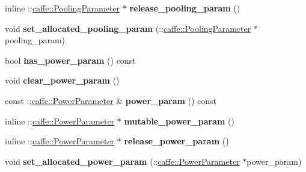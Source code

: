 \begin{DoxyCompactItemize}
\item 
\mbox{\label{classcaffe_1_1_v1_layer_parameter_a87d7d6df46f4474a17a983291fba08db}} 
inline \+::\mbox{\hyperlink{classcaffe_1_1_pooling_parameter}{caffe\+::\+Pooling\+Parameter}} $\ast$ {\bfseries release\+\_\+pooling\+\_\+param} ()
\item 
\mbox{\label{classcaffe_1_1_v1_layer_parameter_a6b72b3c1dfd7142581b07d03fc73a9e9}} 
void {\bfseries set\+\_\+allocated\+\_\+pooling\+\_\+param} (\+::\mbox{\hyperlink{classcaffe_1_1_pooling_parameter}{caffe\+::\+Pooling\+Parameter}} $\ast$pooling\+\_\+param)
\item 
\mbox{\label{classcaffe_1_1_v1_layer_parameter_a6e8e04bd7ef784bfcfd0dc4599c19d61}} 
bool {\bfseries has\+\_\+power\+\_\+param} () const
\item 
\mbox{\label{classcaffe_1_1_v1_layer_parameter_a216d1604476c56a1770cea735de44e53}} 
void {\bfseries clear\+\_\+power\+\_\+param} ()
\item 
\mbox{\label{classcaffe_1_1_v1_layer_parameter_a2e509f9f02cca0c09a834c24d456e1a3}} 
const \+::\mbox{\hyperlink{classcaffe_1_1_power_parameter}{caffe\+::\+Power\+Parameter}} \& {\bfseries power\+\_\+param} () const
\item 
\mbox{\label{classcaffe_1_1_v1_layer_parameter_af0abe41accdc25984c8e19e66c3aa08b}} 
inline \+::\mbox{\hyperlink{classcaffe_1_1_power_parameter}{caffe\+::\+Power\+Parameter}} $\ast$ {\bfseries mutable\+\_\+power\+\_\+param} ()
\item 
\mbox{\label{classcaffe_1_1_v1_layer_parameter_ab711f76e2e11f8889f263d880b0d6998}} 
inline \+::\mbox{\hyperlink{classcaffe_1_1_power_parameter}{caffe\+::\+Power\+Parameter}} $\ast$ {\bfseries release\+\_\+power\+\_\+param} ()
\item 
\mbox{\label{classcaffe_1_1_v1_layer_parameter_a445abb81939e0444a3638a2e633be50a}} 
void {\bfseries set\+\_\+allocated\+\_\+power\+\_\+param} (\+::\mbox{\hyperlink{classcaffe_1_1_power_parameter}{caffe\+::\+Power\+Parameter}} $\ast$power\+\_\+param)

\end{DoxyCompactItemize}
